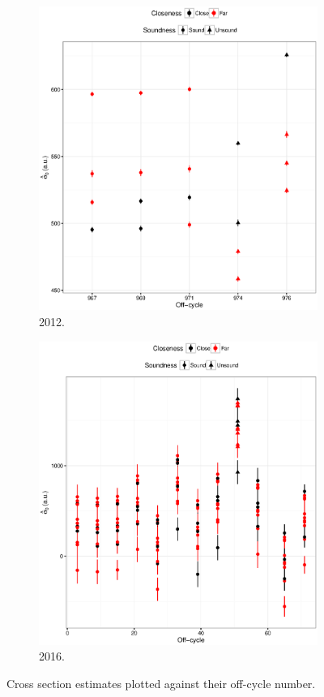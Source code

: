 \documentclass[reprint]{revtex4-1}
\newcommand{\scl}{.4}
\begin{document}
\begin{figure}
\centering
	\begin{subfigure}{.5\textwidth}
		\includegraphics[scale=\scl]{img/Cross-Section2012_all.eps}
		\caption{2012.}
	\end{subfigure}
		\begin{subfigure}{.5\textwidth}
			\includegraphics[scale=\scl]{img/CS0mb2016_all.eps}
			\caption{2016.}
		\end{subfigure}
\caption{Cross section estimates plotted against their off-cycle number\label{fig:CS-all}.}
\end{figure}
\end{document}

